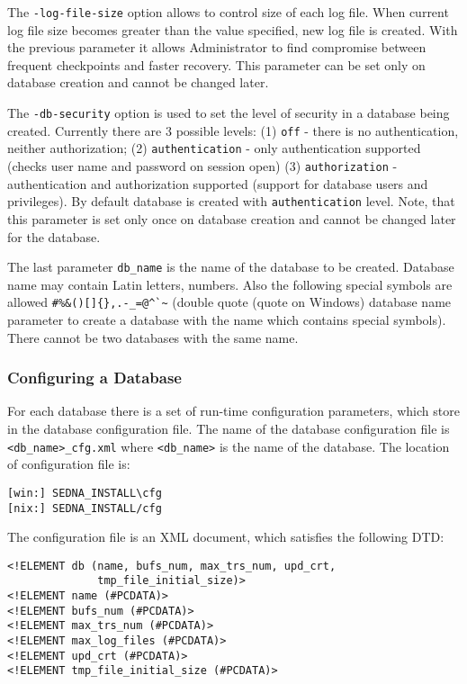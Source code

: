 \documentclass[a4paper,12pt]{article}
\begin{document}
The \verb!-log-file-size! option allows to control size of each log file. When
current log file size becomes greater than the value specified, new log file is
created. With the previous parameter it allows Administrator to find compromise
between frequent checkpoints and faster recovery. This parameter can be set only
on database creation and cannot be changed later.

The \verb!-db-security! option is used to set the level of security in a
database being created. Currently there are 3 possible levels: (1) \verb!off! -
there is no authentication, neither authorization; (2) \verb!authentication! -
only authentication supported (checks user name and password on session open)
(3) \verb!authorization! - authentication and authorization supported (support
for database users and privileges). By default database is created with
\verb!authentication! level. Note, that this parameter is set only once on
database creation and cannot be changed later for the database.

The last parameter \verb!db_name! is the name of the database to be created.
Database name may contain Latin letters, numbers. Also the following special
symbols are allowed \verb!#%&()[]{},.-_=@^`~! (double quote (quote on Windows)
database name parameter to create a database with the name which contains
special symbols). There cannot be two databases with the same name.


\subsubsection{Configuring a Database}
\label{ConfigDB}

For each database there is a set of run-time configuration parameters, which
store in the database configuration file. The name of the database configuration
file is \verb!<db_name>_cfg.xml! where \verb!<db_name>! is the name of the
database. The location of configuration file is:

\begin{verbatim}
[win:] SEDNA_INSTALL\cfg
[nix:] SEDNA_INSTALL/cfg
\end{verbatim}

The configuration file is an XML document, which satisfies the following DTD:

\small{
\begin{verbatim}
<!ELEMENT db (name, bufs_num, max_trs_num, upd_crt,
              tmp_file_initial_size)>
<!ELEMENT name (#PCDATA)>
<!ELEMENT bufs_num (#PCDATA)>
<!ELEMENT max_trs_num (#PCDATA)>
<!ELEMENT max_log_files (#PCDATA)>
<!ELEMENT upd_crt (#PCDATA)>
<!ELEMENT tmp_file_initial_size (#PCDATA)>
\end{verbatim}}
\end{document}
